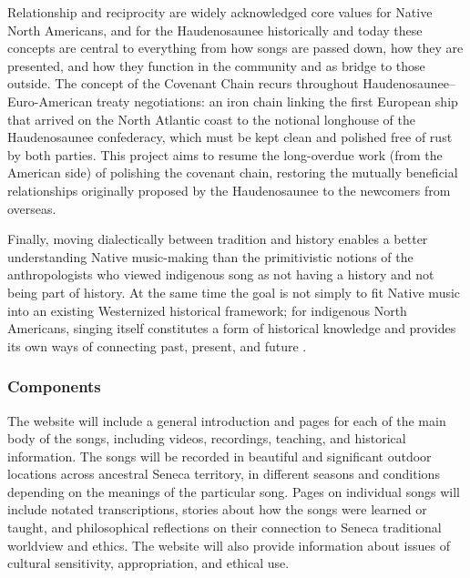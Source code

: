 \documentclass{neh}
\begin{document}
Relationship and reciprocity are widely acknowledged core values for Native
North Americans, and for the Haudenosaunee historically and today these
concepts are central to everything from how songs are passed down, how they
are presented, and how they function in the community and as bridge to those
outside. 
The concept of the Covenant Chain recurs throughout
Haudenosaunee--Euro-American treaty negotiations: an iron chain linking the
first European ship that arrived on the North Atlantic coast to the notional
longhouse of the Haudenosaunee confederacy, which must be kept clean and
polished free of rust by both parties.
This project aims to resume the long-overdue work (from the American side) of
polishing the covenant chain, restoring the mutually beneficial relationships
originally proposed by the Haudenosaunee to the newcomers from overseas.

Finally, moving dialectically between tradition and history enables a better
understanding Native music-making than the primitivistic notions of the
anthropologists who viewed indigenous song as not having a history and not
being part of history.
At the same time the goal is not simply to fit Native music into an existing
Westernized historical framework; for indigenous North Americans, singing
itself constitutes a form of historical knowledge and provides its own ways of
connecting past, present, and future
\Autocite{Diamond:NativeAmericanHistory}.

\subsubsection{Components}

The website will include a general introduction and pages for each of the main
body of the songs, including videos, recordings, teaching, and historical
information.
The songs will be recorded in beautiful and significant outdoor locations
across ancestral Seneca territory, in different seasons and conditions
depending on the meanings of the particular song.
Pages on individual songs will include notated transcriptions, stories about
how the songs were learned or taught, and philosophical reflections on their
connection to Seneca traditional worldview and ethics.
The website will also provide information about issues of cultural
sensitivity, appropriation, and ethical use.
\end{document}
